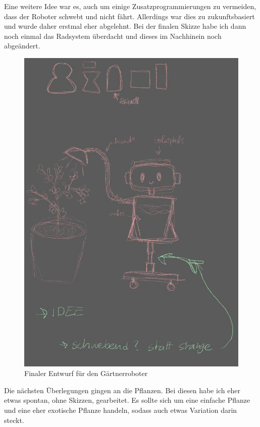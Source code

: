 \par
Eine weitere Idee war es, auch um einige Zusatzprogrammierungen zu vermeiden, dass der Roboter schwebt und nicht fährt. Allerdings war dies zu zukunftsbasiert und wurde daher erstmal eher abgelehnt. Bei der finalen Skizze habe ich dann noch einmal das Radsystem überdacht und dieses im Nachhinein noch abgeändert.  
\begin{figure}[H]
	\centering
	\includegraphics[height=0.3\pageheight,keepaspectratio]{pics/2} 
	\caption{Finaler Entwurf für den Gärtnerroboter}
\end{figure}
\par
Die nächsten Überlegungen gingen an die Pflanzen. Bei diesen habe ich eher etwas spontan, ohne Skizzen, gearbeitet. Es sollte sich um eine einfache Pflanze und eine eher exotische Pflanze handeln, sodass auch etwas Variation darin steckt.
\par
